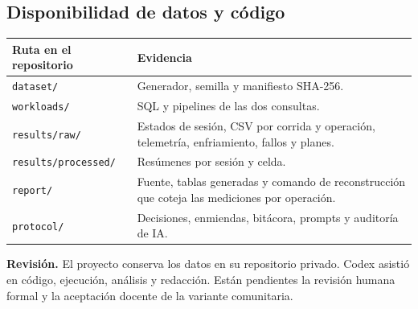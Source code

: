 \documentclass[10pt,a4paper]{article}
\newcommand{\clave}[1]{\texttt{#1}}
\begin{document}
\subsection{Disponibilidad de datos y código}
\begin{tabularx}{\linewidth}{@{}lX@{}}
\toprule Ruta en el repositorio & Evidencia\\
\midrule
\clave{dataset/} & Generador, semilla y manifiesto SHA-256.\\
\clave{workloads/} & SQL y pipelines de las dos consultas.\\
\clave{results/raw/} & Estados de sesión, CSV por corrida y operación, telemetría, enfriamiento, fallos y planes.\\
\clave{results/processed/} & Resúmenes por sesión y celda.\\
\clave{report/} & Fuente, tablas generadas y comando de reconstrucción que coteja las mediciones por operación.\\
\clave{protocol/} & Decisiones, enmiendas, bitácora, prompts y auditoría de IA.\\
\bottomrule
\end{tabularx}

\textbf{Revisión.} El proyecto conserva los datos en su repositorio privado. Codex asistió en código, ejecución, análisis y redacción. Están pendientes la revisión humana formal y la aceptación docente de la variante comunitaria.
\end{document}
